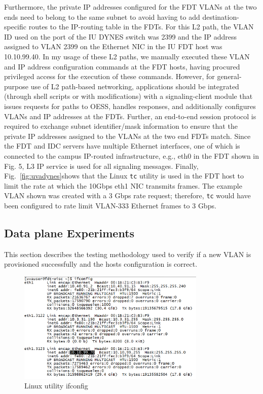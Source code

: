 {Furthermore, the private IP addresses configured for the
FDT VLANs at the two ends need to belong to the same
subnet to avoid having to add destination-specific routes to
the IP-routing table in the FDTs. For this L2 path, the
VLAN ID used on the port of the IU DYNES switch was
2399 and the IP address assigned to VLAN 2399 on the
Ethernet NIC in the IU FDT host was 10.10.99.40.
In my usage of these L2 paths,
we manually executed these VLAN and IP address configuration commands at the FDT hosts, having procured privileged access for the execution of these commands. However, for general-purpose use of L2 path-based networking, applications should be integrated (through shell scripts or with
modifications) with a signaling-client module that issues requests for paths to OESS, handles responses, and additionally configures VLANs and IP addresses at the FDTs. Further, an end-to-end session protocol is required to exchange
subnet identifier/mask information to ensure that the private IP addresses assigned to the VLANs at the two end
FDTs match. Since the FDT and IDC servers have multiple Ethernet interfaces, one of which is connected to the campus IP-routed
infrastructure, e.g., eth0 in the FDT shown in Fig. 5, L3 IP
service is used for all signaling messages.
Finally, Fig.~\ref{fig:uvadynes}shows that the Linux \texttt{tc} utility is used in the
FDT host to limit the rate at which the 10Gbps eth1 NIC
transmits frames. The example VLAN shown was created
with a 3 Gbps rate request; therefore, \texttt{tc} would have been
configured to rate limit VLAN-333 Ethernet frames to 3
Gbps.

\subsection{Data plane Experiments}
This section describes the testing methodology used to verify if a new VLAN is provisioned successfully and the hosts configuration is correct.
\begin{figure}[htb!]
\centering
\includegraphics[width=0.8\textwidth]{figures/ifconfig.png}
\caption{Linux utility ifconfig}
\label{fig:ifconfig}
\end{figure} 

}
